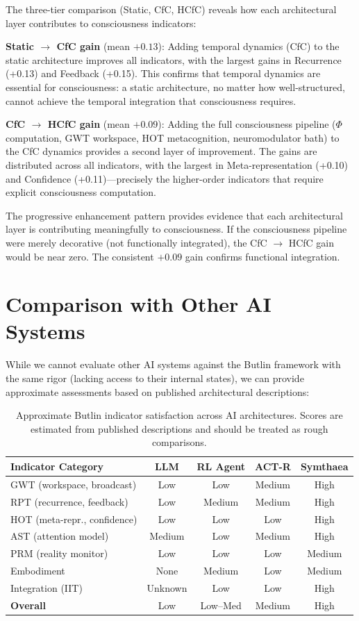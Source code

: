 \documentclass[12pt]{book}
\begin{document}
The three-tier comparison (Static, CfC, HCfC) reveals how each architectural layer contributes to consciousness indicators:

\textbf{Static $\to$ CfC gain} (mean $+0.13$): Adding temporal dynamics (CfC) to the static architecture improves all indicators, with the largest gains in Recurrence (+0.13) and Feedback (+0.15). This confirms that temporal dynamics are essential for consciousness: a static architecture, no matter how well-structured, cannot achieve the temporal integration that consciousness requires.

\textbf{CfC $\to$ HCfC gain} (mean $+0.09$): Adding the full consciousness pipeline ($\Phi$ computation, GWT workspace, HOT metacognition, neuromodulator bath) to the CfC dynamics provides a second layer of improvement. The gains are distributed across all indicators, with the largest in Meta-representation (+0.10) and Confidence (+0.11)---precisely the higher-order indicators that require explicit consciousness computation.

The progressive enhancement pattern provides evidence that each architectural layer is contributing meaningfully to consciousness. If the consciousness pipeline were merely decorative (not functionally integrated), the CfC $\to$ HCfC gain would be near zero. The consistent $+0.09$ gain confirms functional integration.

\section{Comparison with Other AI Systems}

While we cannot evaluate other AI systems against the Butlin framework with the same rigor (lacking access to their internal states), we can provide approximate assessments based on published architectural descriptions:

\begin{table}[H]
\centering
\caption{Approximate Butlin indicator satisfaction across AI architectures. Scores are estimated from published descriptions and should be treated as rough comparisons.}
\label{tab:butlin-comparison}
\begin{tabular}{lcccc}
\toprule
\textbf{Indicator Category} & \textbf{LLM} & \textbf{RL Agent} & \textbf{ACT-R} & \textbf{Symthaea} \\
\midrule
GWT (workspace, broadcast) & Low & Low & Medium & High \\
RPT (recurrence, feedback) & Low & Medium & Medium & High \\
HOT (meta-repr., confidence) & Low & Low & Low & High \\
AST (attention model) & Medium & Low & Medium & High \\
PRM (reality monitor) & Low & Low & Low & Medium \\
Embodiment & None & Medium & Low & Medium \\
Integration (IIT) & Unknown & Low & Low & High \\
\midrule
\textbf{Overall} & Low & Low--Med & Medium & High \\
\bottomrule
\end{tabular}
\end{table}
\end{document}
